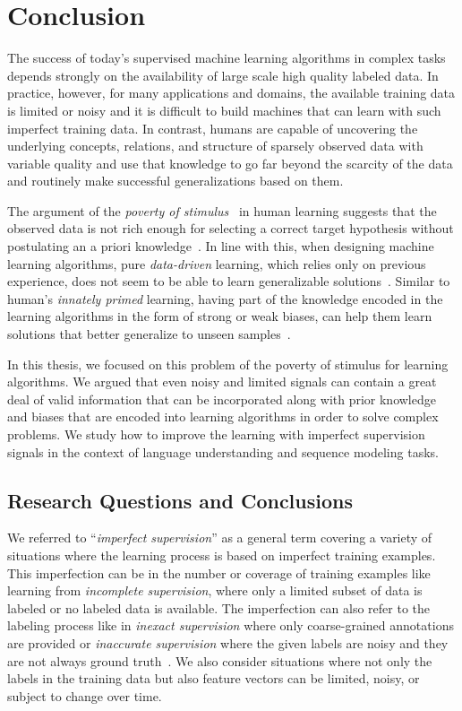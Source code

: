 \chapter{Conclusion}
The success of today's supervised machine learning algorithms in complex tasks depends strongly on the availability of large scale high quality labeled data. In practice, however, for many applications and domains, the available training data is limited or noisy and it is difficult to build machines that can learn with such imperfect training data.
%
In contrast, humans are capable of uncovering the underlying concepts, relations, and structure of sparsely observed data with variable quality and use that knowledge to go far beyond the scarcity of the data and routinely make successful generalizations based on them.

The argument of the \emph{poverty of stimulus}~\citep{chomsky1980rules} in human learning suggests that the observed data is not rich enough for selecting a correct target hypothesis without postulating an a priori knowledge~\citep{chomsky1971problems}.
%
In line with this, when designing machine learning algorithms, pure \emph{data-driven} learning, which relies only on previous experience, does not seem to be able to learn generalizable solutions~\citep{Mitchell80theneed}. Similar to human's \emph{innately primed} learning, having part of the knowledge encoded in the learning algorithms in the form of strong or weak biases, can help them learn solutions that better generalize to unseen samples~\citep{Mitchell:1997:ML}.

In this thesis, we focused on this problem of the poverty of stimulus for learning algorithms. We argued that even noisy and limited signals can contain a great deal of valid information that can be incorporated along with prior knowledge and biases that are encoded into learning algorithms in order to solve complex problems. 
We study how to improve the learning with imperfect supervision signals in the context of language understanding and sequence modeling tasks.


\section{Research Questions and Conclusions}
We referred to ``\emph{imperfect supervision}'' as a general term covering a variety of situations where the learning process is based on imperfect training examples. This imperfection can be in the number or coverage of training examples like learning from \emph{incomplete supervision}, where only a limited subset of data is labeled or no labeled data is available. The imperfection can also refer to the labeling process like in \emph{inexact supervision} where only coarse-grained annotations are provided or \emph{inaccurate supervision} where the given labels are noisy and they are not always ground truth~\citep{zhou2018brief}. We also consider situations where not only the labels in the training data but also feature vectors can be limited, noisy, or subject to change over time.

